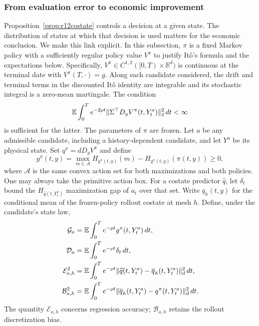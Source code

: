 \subsubsection{From evaluation error to economic improvement}
\label{sec:r14costate}
Proposition~\ref{prop:r12costate} controls a decision at a given state.
The distribution of states at which that decision is used matters for
the economic conclusion. We make this link explicit. In this subsection,
$\pi$ is a fixed Markov policy with a sufficiently regular policy value
$V^\pi$ to justify It\^o's formula and the expectations below. Specifically, $V^\pi\in C^{1,2}([0,T)\times\mathbb R^d)$ is continuous at the terminal date with $V^\pi(T,\cdot)=g$. Along each candidate considered, the drift and terminal terms in the discounted It\^o identity are integrable and its stochastic integral is a zero-mean martingale. The condition
\[
 \mathbb E\int_0^T e^{-2\rho t}
 \|\Sigma^\top D_yV^\pi(t,Y_t^a)\|_2^2\,dt<\infty
\]
is sufficient for the latter. The parameters of $\pi$ are frozen. Let $a$ be any admissible candidate, including
a history-dependent candidate, and let $Y^a$ be its physical state.
Set $q^\pi=dD_yV^\pi$ and define
\[
 g^\pi(t,y)=\max_{m\in\mathcal A}H_{q^\pi(t,y)}(m)
                 -H_{q^\pi(t,y)}(\pi(t,y))\geq0,
\]
where $\mathcal A$ is the same convex action set for both maximizations
and both policies. One may always take the primitive action box.
For a costate predictor $\widehat q$, let $\delta_t$ bound the
$H_{\widehat q(t,Y_t^a)}$ maximization gap of $a_t$ over that set.
Write $\overline q_h(t,y)$ for the conditional mean of the frozen-policy
rollout costate at mesh $h$. Define, under the candidate's state law,
\begin{align*}
 \mathcal G_a&=\mathbb E\int_0^T e^{-\rho t}g^\pi(t,Y_t^a)\,dt,\\
 \mathcal D_a&=\mathbb E\int_0^T e^{-\rho t}\delta_t\,dt,\\
 \mathcal E_{a,h}^2&=\mathbb E\int_0^T e^{-\rho t}
      \|\widehat q(t,Y_t^a)-\overline q_h(t,Y_t^a)\|_d^2\,dt,\\
 \mathcal B_{a,h}^2&=\mathbb E\int_0^T e^{-\rho t}
      \|\overline q_h(t,Y_t^a)-q^\pi(t,Y_t^a)\|_d^2\,dt.
\end{align*}
The quantity $\mathcal E_{a,h}$ concerns regression accuracy;
$\mathcal B_{a,h}$ retains the rollout discretization bias.

